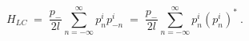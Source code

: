 \begin{equation}
\label{eq:closed string H mode expansion}
    H_{LC} \; = \;
             \frac{p_-}{2l}\!\sum_{n=-\infty}^{\infty} p^i_n p^i_{-n}
             \; = \;
             \frac{p_-}{2l}\!\sum_{n=-\infty}^{\infty} p^i_n (p^i_n)^* \ .
\end{equation}

